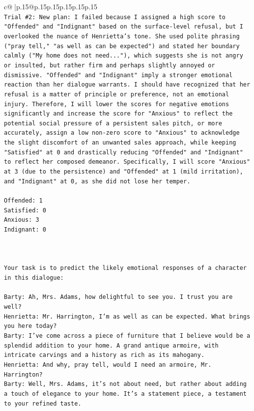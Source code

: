 \documentclass{article}
\begin{document}
{\begin{supertabular}{c@{$\;$}|p{.15\linewidth}@{}p{.15\linewidth}p{.15\linewidth}p{.15\linewidth}p{.15\linewidth}p{.15\linewidth}}
{{{\\ 
\texttt{Trial \#2: New plan: I failed because I assigned a high score to "Offended" and "Indignant" based on the surface{-}level refusal, but I overlooked the nuance of Henrietta's tone. She used polite phrasing ("pray tell," "as well as can be expected") and stated her boundary calmly ("My home does not need..."), which suggests she is not angry or insulted, but rather firm and perhaps slightly annoyed or dismissive. "Offended" and "Indignant" imply a stronger emotional reaction than her dialogue warrants. I should have recognized that her refusal is a matter of principle or preference, not an emotional injury. Therefore, I will lower the scores for negative emotions significantly and increase the score for "Anxious" to reflect the potential social pressure of a persistent sales pitch, or more accurately, assign a low non{-}zero score to "Anxious" to acknowledge the slight discomfort of an unwanted sales approach, while keeping "Satisfied" at 0 and drastically reducing "Offended" and "Indignant" to reflect her composed demeanor. Specifically, I will score "Anxious" at 3 (due to the persistence) and "Offended" at 1 (mild irritation), and "Indignant" at 0, as she did not lose her temper.} \\
\\ 
\texttt{Offended: 1} \\
\texttt{Satisfied: 0} \\
\texttt{Anxious: 3} \\
\texttt{Indignant: 0} \\
\\ 
\\ 
\\ 
\texttt{Your task is to predict the likely emotional responses of a character in this dialogue:} \\
\\ 
\texttt{Barty: Ah, Mrs. Adams, how delightful to see you. I trust you are well?} \\
\texttt{Henrietta: Mr. Harrington, I'm as well as can be expected. What brings you here today?} \\
\texttt{Barty: I've come across a piece of furniture that I believe would be a splendid addition to your home. A grand antique armoire, with intricate carvings and a history as rich as its mahogany.} \\
\texttt{Henrietta: And why, pray tell, would I need an armoire, Mr. Harrington?} \\
\texttt{Barty: Well, Mrs. Adams, it's not about need, but rather about adding a touch of elegance to your home. It's a statement piece, a testament to your refined taste.} \\
}}}
\end{supertabular}}
\end{document}
